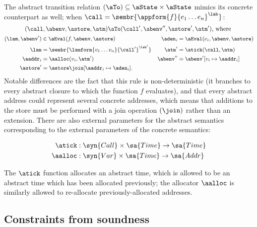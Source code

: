 The abstract transition relation $(\aTo) \subseteq
\aState \times \aState$ mimics its concrete counterpart as well; when
$\call = \sembr{\appform{f}{e_1 \ldots e_n}^\lab}$:
\begin{gather*}
  (\call,\abenv,\astore,\atm) 
  \aTo
  (\call',\abenv'',\astore',\atm')\text{, where }
  \\
\begin{small}\begin{align*}
  (\lam,\abenv') &\in \aEval(f,\abenv,\astore)
  &
  \aden_i &= \aEval(e_i,\abenv,\astore)
  \\
  \lam &= \sembr{\lamform{v_1 \ldots v_n}{\call'}^{\lab'}}
  &
  \atm' &= \atick(\call,\atm)
  \\
  \aaddr_i &= \aalloc(v_i,\atm')
  &
  \abenv'' &= \abenv'[v_i \mapsto \aaddr_i]
  \\
  \astore' &= \astore \join [\aaddr_i \mapsto \aden_i]\text.
\end{align*}\end{small}\end{gather*}
Notable differences are the fact that this rule is non-deterministic
(it branches to every abstract closure to which the function $f$
evaluates), and that every abstract address could represent several
concrete addresses, which means that additions to the store must be
performed with a join operation $(\join)$ rather than an extension.
There are also external parameters for the abstract semantics
corresponding to the external parameters of the concrete semantics:
\begin{small}\begin{align*}
  \atick &: \syn{Call} \times \sa{Time} \to \sa{Time}
  \\
  \aalloc &: \syn{Var} \times \sa{Time} \to \sa{Addr}
\end{align*}\end{small}The $\atick$ function allocates an abstract time, which is allowed to
be an abstract time which has been allocated previously; the allocator
$\aalloc$ is similarly allowed to re-allocate previously-allocated addresses.


\subsection{Constraints from soundness}

